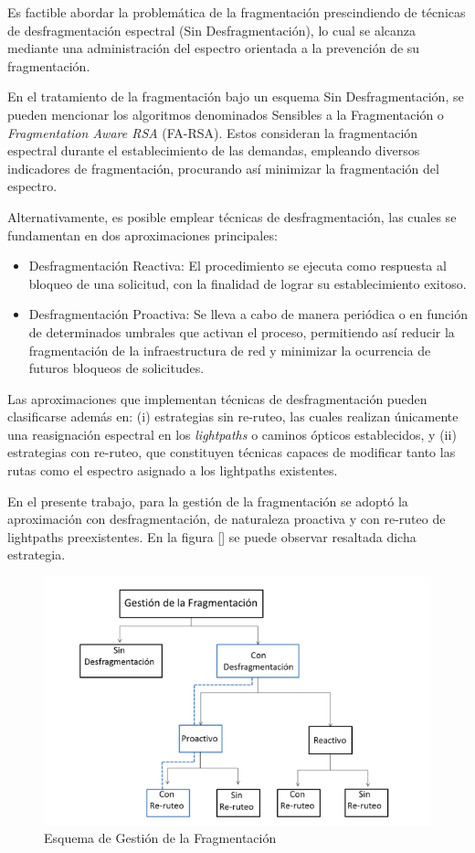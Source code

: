 Es factible abordar la problemática de la fragmentación prescindiendo de técnicas de desfragmentación espectral (Sin Desfragmentación), lo cual se alcanza mediante una administración del espectro orientada a la prevención de su fragmentación.
%

En el tratamiento de la fragmentación bajo un esquema Sin Desfragmentación, se pueden mencionar los algoritmos denominados Sensibles a la Fragmentación o \textit{Fragmentation Aware RSA} (FA-RSA). Estos consideran la fragmentación espectral durante el establecimiento de las demandas, empleando diversos indicadores de fragmentación, procurando así minimizar la fragmentación del espectro.
%

Alternativamente, es posible emplear técnicas de desfragmentación, las cuales se fundamentan en dos aproximaciones principales:
\begin{itemize}
         \item Desfragmentación Reactiva: El procedimiento se ejecuta como respuesta al bloqueo de una solicitud, con la finalidad de lograr su establecimiento exitoso.
         \item Desfragmentación Proactiva: Se lleva a cabo de manera periódica o en función de determinados umbrales que activan el proceso, permitiendo así reducir la fragmentación de la infraestructura de red y minimizar la ocurrencia de futuros bloqueos de solicitudes.
\end{itemize}
Las aproximaciones que implementan técnicas de desfragmentación pueden clasificarse además en: (i) estrategias sin re-ruteo, las cuales realizan únicamente una reasignación espectral en los \textit{lightpaths} o caminos ópticos establecidos, y (ii) estrategias con re-ruteo, que constituyen técnicas capaces de modificar tanto las rutas como el espectro asignado a los lightpaths existentes.
%

En el presente trabajo, para la gestión de la fragmentación se adoptó la aproximación con desfragmentación, de naturaleza proactiva y con re-ruteo de lightpaths preexistentes. En la figura [] se puede observar resaltada dicha estrategia.
%

\begin{figure}[H]
    \centering
    \includegraphics[width=1\textwidth]{capitulos/img/Gestion_Fragmentacion.PNG}
    \caption{Esquema de Gestión de la Fragmentación}
    \label{fig:gestion_fragmentacion}
\end{figure}
%


